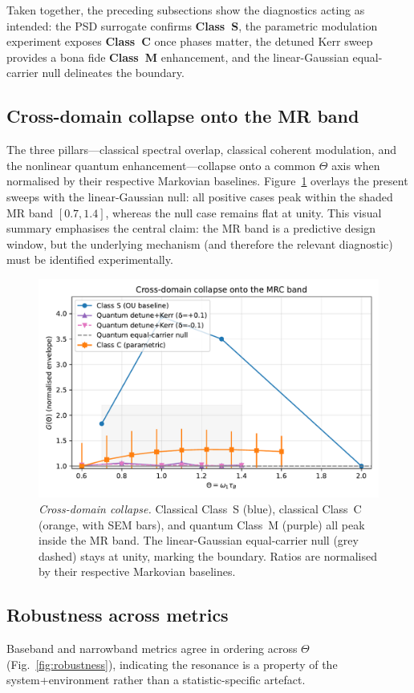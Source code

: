 \documentclass[11pt,letterpaper]{article}
\DeclareRobustCommand{\classS}{\textbf{Class~S}\xspace}
\DeclareRobustCommand{\classC}{\textbf{Class~C}\xspace}
\DeclareRobustCommand{\classM}{\textbf{Class~M}\xspace}
\begin{document}
Taken together, the preceding subsections show the diagnostics acting as intended: the PSD surrogate confirms \classS, the parametric modulation experiment exposes \classC{} once phases matter, the detuned Kerr sweep provides a bona fide \classM{} enhancement, and the linear-Gaussian equal-carrier null delineates the boundary.

\subsection{Cross-domain collapse onto the MR band}
The three pillars---classical spectral overlap, classical coherent modulation, and the nonlinear quantum enhancement---collapse onto a common $\Theta$ axis when normalised by their respective Markovian baselines. Figure~\ref{fig:collapse} overlays the present sweeps with the linear-Gaussian null: all positive cases peak within the shaded MR band $[0.7,1.4]$, whereas the null case remains flat at unity. This visual summary emphasises the central claim: the MR band is a predictive design window, but the underlying mechanism (and therefore the relevant diagnostic) must be identified experimentally.

\begin{figure}[t]
\centering
\includegraphics[width=0.8\linewidth]{figE_collapse.pdf}
\caption{\label{fig:collapse}\emph{Cross-domain collapse.} Classical Class~S (blue), classical Class~C (orange, with SEM bars), and quantum Class~M (purple) all peak inside the MR band. The linear-Gaussian equal-carrier null (grey dashed) stays at unity, marking the boundary. Ratios are normalised by their respective Markovian baselines.}
\end{figure}

\subsection{Robustness across metrics}
\label{sec:results_robust}
Baseband and narrowband metrics agree in ordering across $\Theta$ (Fig.~\ref{fig:robustness}), indicating the resonance is a property of the system+environment rather than a statistic-specific artefact.
\end{document}
